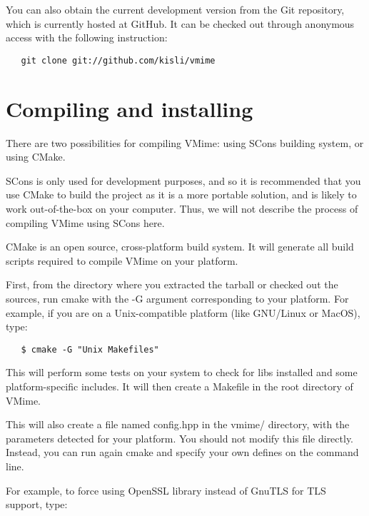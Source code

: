 You can also obtain the current development version from the Git repository,
which is currently hosted at GitHub. It can be checked out through anonymous
access with the following instruction:

\begin{verbatim}
   git clone git://github.com/kisli/vmime
\end{verbatim}

\section{Compiling and installing}

There are two possibilities for compiling VMime: using SCons building system,
or using CMake.

SCons is only used for development purposes, and so it is recommended that you
use CMake to build the project as it is a more portable solution, and is
likely to work out-of-the-box on your computer. Thus, we will not describe
the process of compiling VMime using SCons here.

CMake is an open source, cross-platform build system. It will generate all
build scripts required to compile VMime on your platform.

First, from the directory where you extracted the tarball or checked out
the sources, run {\vcode cmake} with the {\vcode -G} argument corresponding
to your platform. For example, if you are on a Unix-compatible platform (like
GNU/Linux or MacOS), type:

\begin{verbatim}
   $ cmake -G "Unix Makefiles"
\end{verbatim}

This will perform some tests on your system to check for libs installed
and some platform-specific includes. It will then create a Makefile in
the root directory of VMime.


This will also create a file named {\vcode config.hpp} in the {\vcode vmime/}
directory, with the parameters detected for your platform. You should not
modify this file directly. Instead, you can run again {\vcode cmake} and
specify your own defines on the command line.

For example, to force using OpenSSL library instead of GnuTLS for TLS
support, type:

